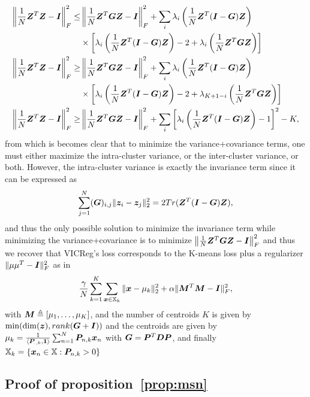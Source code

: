 \documentclass{article} %
\begin{document}
\begin{align*}
     \left\|\frac{1}{N}{\bm{Z}}^T{\bm{Z}}-{\bm{I}}\right\|_F^2\leq& \left\|\frac{1}{N}{\bm{Z}}^T{\bm{G}}{\bm{Z}}-{\bm{I}}\right\|_F^2+\sum_i \lambda_i \left(\frac{1}{N}{\bm{Z}}^T({\bm{I}}-{\bm{G}}){\bm{Z}}\right)\\
     &\times \left[\lambda_i \left(\frac{1}{N}{\bm{Z}}^T({\bm{I}}-{\bm{G}}){\bm{Z}}\right)-2+\lambda_i \left(\frac{1}{N}{\bm{Z}}^T{\bm{G}}{\bm{Z}}\right)\right]\\
     \left\|\frac{1}{N}{\bm{Z}}^T{\bm{Z}}-{\bm{I}}\right\|_F^2\geq& \left\|\frac{1}{N}{\bm{Z}}^T{\bm{G}}{\bm{Z}}-{\bm{I}}\right\|_F^2+\sum_i \lambda_i \left(\frac{1}{N}{\bm{Z}}^T({\bm{I}}-{\bm{G}}){\bm{Z}}\right)\\
     &\times \left[\lambda_i \left(\frac{1}{N}{\bm{Z}}^T({\bm{I}}-{\bm{G}}){\bm{Z}}\right)-2+\lambda_{K+1-i} \left(\frac{1}{N}{\bm{Z}}^T{\bm{G}}{\bm{Z}}\right)\right]\\
     \left\|\frac{1}{N}{\bm{Z}}^T{\bm{Z}}-{\bm{I}}\right\|_F^2\geq& \left\|\frac{1}{N}{\bm{Z}}^T{\bm{G}}{\bm{Z}}-{\bm{I}}\right\|_F^2+\sum_i \left[\lambda_i \left(\frac{1}{N}{\bm{Z}}^T({\bm{I}}-{\bm{G}}){\bm{Z}}\right)-1\right]^2-K,
\end{align*}
from which is becomes clear that to minimize the variance+covariance terms, one must either maximize the intra-cluster variance, or the inter-cluster variance, or both. However, the intra-cluster variance is exactly the invariance term since it can be expressed as
\begin{align*}
    \sum_{j=1}^{N}({\bm{G}})_{i,j}\|{\bm{z}}_{i}-{\bm{z}}_{j}\|_2^2=2 Tr({\bm{Z}}^T({\bm{I}}-{\bm{G}}){\bm{Z}}),
\end{align*}
and thus the only possible solution to minimize the invariance term while minimizing the variance+covariance is to minimize $\left\|\frac{1}{N}{\bm{Z}}^T{\bm{G}}{\bm{Z}}-{\bm{I}}\right\|_F^2$ and thus we recover that VICReg's loss corresponds to the K-means loss plus a regularizer $\|\mu\mu^T-{\bm{I}} \|_F^2$ as in
\begin{align*}
    \frac{\gamma}{N}\sum_{k=1}^{K}\sum_{{\bm{x}} \in {\mathbb{X}}_k}\|{\bm{x}}-\mu_k\|_2^2+\alpha\|{\bm{M}}^T{\bm{M}}-{\bm{I}} \|_F^2,
\end{align*}
with ${\bm{M}}\triangleq [\mu_1,\dots,\mu_K]$, and the number of centroids $K$ is given by $\min(\dim({\bm{z}}),rank({\bm{G}}+{\bm{I}}))$ and the centroids are given by $\mu_k=\frac{1}{\langle {\bm{P}}_{.,k},\mathbf{1}\rangle}\sum_{n=1}^{N}{\bm{P}}_{n,k}{\bm{x}}_n$ with ${\bm{G}}={\bm{P}}^T{\bm{D}}{\bm{P}}$, and finally ${\mathbb{X}}_k=\{{\bm{x}}_n \in {\mathbb{X}}:{\bm{P}}_{n,k}>0\}$


\subsection{Proof of proposition~\ref{prop:msn}}
\label{proof:kmeans3}
\end{document}
